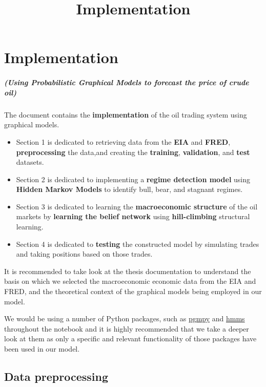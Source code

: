 \documentclass[11pt]{report}
\title{Implementation}
\providecommand{\tightlist}{%
      \setlength{\itemsep}{0pt}\setlength{\parskip}{0pt}}
\begin{document}
    
\setcounter{chapter}{3}
\chapter{Implementation}\label{implementation}

\hypertarget{using-probabilistic-graphical-models-to-forecast-the-price-of-crude-oil}{%
\paragraph{(Using Probabilistic Graphical Models to forecast the price
of crude
oil)}\label{using-probabilistic-graphical-models-to-forecast-the-price-of-crude-oil}}

The document contains the \textbf{implementation} of the oil trading
system using graphical models.

\begin{itemize}
\tightlist
\item
  Section 1 is dedicated to retrieving data from the
  \textbf{EIA} and \textbf{FRED}, \textbf{preprocessing} the data,and
  creating the \textbf{training}, \textbf{validation}, and \textbf{test}
  datasets.
\item
  Section 2 is dedicated to implementing a \textbf{regime
  detection model} using \textbf{Hidden Markov Models} to identify bull,
  bear, and stagnant regimes.
\item
  Section 3 is dedicated to learning the \textbf{macroeconomic
  structure} of the oil markets by \textbf{learning the belief network}
  using \textbf{hill-climbing} structural learning.
\item
  Section 4 is dedicated to \textbf{testing} the constructed
  model by simulating trades and taking positions based on those trades.
\end{itemize}

It is recommended to take look at the thesis documentation to understand
the basis on which we selected the macroeconomic economic data from the
EIA and FRED, and the theoretical context of the graphical models being
employed in our model.

We would be using a number of Python packages, such as
\href{http://pgmpy.org/}{pgmpy} and
\href{https://github.com/lopatovsky/HMMs}{hmms} throughout the notebook
and it is highly recommended that we take a deeper look at them as only
a specific and relevant functionality of those packages have been used
in our model.

    \hypertarget{data-preprocessing}{%
\section{Data preprocessing}\label{data-preprocessing}}
\end{document}
